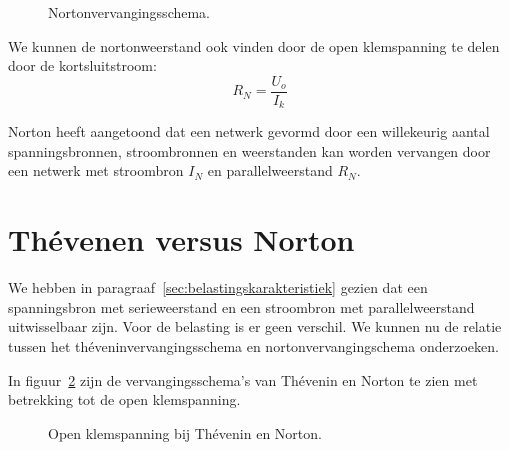 \begin{figure}[!ht]
\centering
{}
\caption{Nortonvervangingsschema.}
\label{fig:gelnortonvervangingsschema}
\end{figure}

We kunnen de nortonweerstand ook vinden door de open klemspanning te delen door de kortsluitstroom:
%
\begin{equation}
R_N = \dfrac{U_o}{I_k}
\end{equation}

Norton heeft aangetoond dat een netwerk gevormd door een willekeurig aantal spanningsbronnen,
stroombronnen en weerstanden kan worden vervangen door een netwerk met stroombron $I_N$ en
parallelweerstand $R_N$.

\section{Th\'evenen versus Norton}
We hebben in paragraaf~\ref{sec:belastingskarakteristiek} gezien dat een spanningsbron met serieweerstand
en een stroombron met parallelweerstand uitwisselbaar zijn. Voor de belasting is er geen verschil.
We kunnen nu de relatie tussen het th\'eveninvervangingsschema en nortonvervangingschema onderzoeken.

In figuur~\ref{fig:gelopenklemspanningbijtheveninennorton} zijn de vervangingsschema's van Th\'evenin
en Norton te zien met betrekking tot de open klemspanning.

\begin{figure}[!ht]
\centering
\begin{subfigure}[b]{0.48\textwidth}
\centering
{}
\end{subfigure}%
\begin{subfigure}[b]{0.48\textwidth}
\centering
{}
\end{subfigure}
\caption{Open klemspanning bij Th\'evenin en Norton.}
\label{fig:gelopenklemspanningbijtheveninennorton}
\end{figure}

